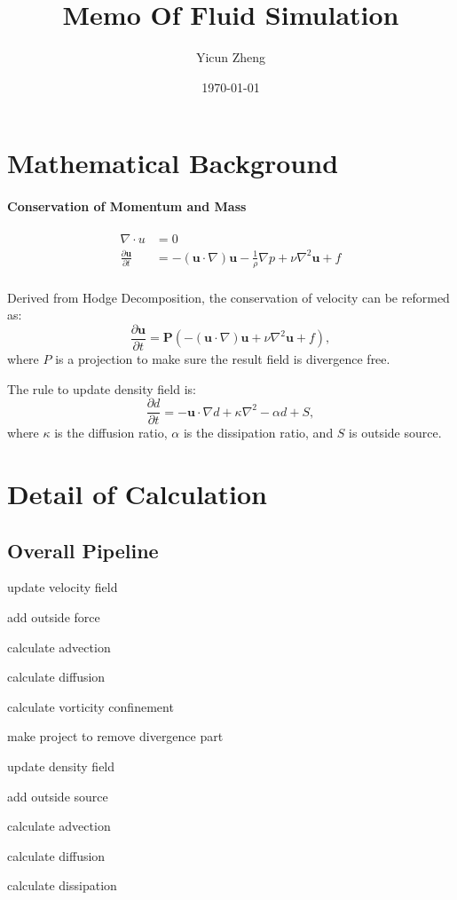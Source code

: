 \documentclass[a4paper, 9pt]{extarticle}
\title{Memo Of Fluid Simulation}
\date{\today}
\author{Yicun Zheng}
\newcommand{\Subitem}[1]{
    {\setlength\itemindent{15pt}\item[-] #1}
}
\begin{document}
\maketitle

\section{Mathematical Background}
\paragraph{Conservation of Momentum and Mass}
\begin{equation}
    \begin{aligned}
    \nabla \cdot u &= 0 \\
    \frac{\partial{\mathbf{u}}}{\partial{t}} &= -(\mathbf{u}\cdot \nabla)\mathbf{u} - \frac{1}{\rho}\nabla p + \nu \nabla^2\mathbf{u} + f\\
    \end{aligned}
    \label{eq:conservation}
\end{equation}

Derived from Hodge Decomposition, the conservation of velocity can be reformed as:
\begin{equation}
    \frac{\partial{\mathbf{u}}}{\partial{t}} = \mathbf{P}(-(\mathbf{u}\cdot \nabla)\mathbf{u} + \nu \nabla^2\mathbf{u} + f),
\end{equation}
where $P$ is a projection to make sure the result field is divergence free.

The rule to update density field is:
\begin{equation}
    \frac{\partial d}{\partial t} = -\mathbf{u}\cdot\nabla d + \kappa \nabla^2 - \alpha d + S,
\end{equation}
where $\kappa$ is the diffusion ratio, $\alpha$ is the dissipation ratio, and $S$ is outside source.

\section{Detail of Calculation}
\subsection{Overall Pipeline}
\begin{itemize}
    \item update velocity field
        \Subitem{add outside force}
        \Subitem{calculate advection}
        \Subitem{calculate diffusion}
        \Subitem{calculate vorticity confinement}
        \Subitem{make project to remove divergence part}
    \item update density field
        \Subitem{add outside source}
        \Subitem{calculate advection}
        \Subitem{calculate diffusion}
        \Subitem{calculate dissipation}
\end{itemize}
\end{document}
